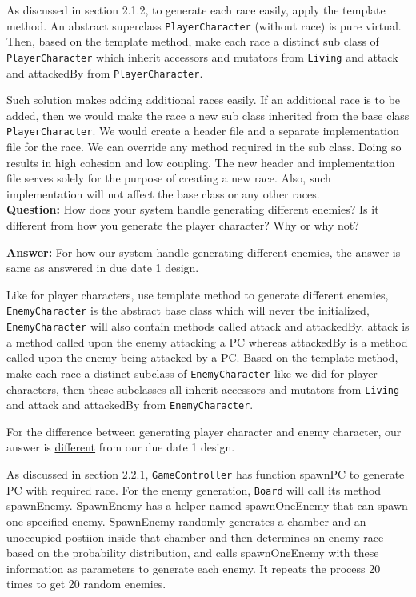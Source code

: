 \documentclass[11pt]{article}
\theoremstyle{plain} \newtheorem{theorem*}{Theorem}[subsection]
\begin{document}
As discussed in section 2.1.2, to generate each race easily, 
apply the template method. An abstract superclass \texttt{PlayerCharacter}
(without race) is pure virtual. Then, based on 
the template method, make each race a distinct sub class of 
\texttt{PlayerCharacter} which inherit accessors and mutators from 
\texttt{Living} and \textsf{attack} and \textsf{attackedBy} from 
\texttt{PlayerCharacter}.

Such solution makes adding additional races easily. If an additional race is to
be added, then we would make the race a new sub class inherited from the base
class \texttt{PlayerCharacter}. We would create a header file and a separate 
implementation file for the race. We can override any method required in the 
sub class. Doing so results in high cohesion and low coupling. The new header 
and implementation file serves solely for the purpose of creating a new race.
Also, such implementation will not affect the base class or any other races.\\

\textbf{Question:}
How does your system handle generating different enemies? Is it different from
how you generate the player character? Why or why not? 

\textbf{Answer:}
For how our system handle generating different enemies, the answer is same as
answered in due date 1 design. 

Like for player characters, use template method to generate different enemies,
\texttt{EnemyCharacter} is the abstract base class which will
never tbe initialized, \texttt{EnemyCharacter} will also contain methods called
\textsf{attack} and \textsf{attackedBy}. 
\textsf{attack} is a method called upon the enemy attacking a PC whereas
\textsf{attackedBy} is a method called upon the enemy being attacked by a PC. 
Based on the template method, make each race a 
distinct subclass of \texttt{EnemyCharacter} like we did for player characters,
then these subclasses all inherit accessors and
mutators from \texttt{Living} and \textsf{attack} and \textsf{attackedBy}
from \texttt{EnemyCharacter}.


For the difference between generating player character and enemy character,
our answer is \underline{different} from our due date 1 design. 

As discussed in section 2.2.1, 
\texttt{GameController} has function \textsf{spawnPC} to generate PC with 
required race. For the enemy generation, \texttt{Board} will call its method
\textsf{spawnEnemy}. \textsf{SpawnEnemy} 
has a helper named \textsf{spawnOneEnemy} that can spawn one specified enemy. 
\textsf{SpawnEnemy} randomly generates a chamber and an unoccupied postiion
inside that chamber and then determines an enemy race based on the probability 
distribution, and calls \textsf{spawnOneEnemy} with these information as
parameters to generate each enemy.
It repeats the process 20 times to get 20 random enemies. 
\end{document}
